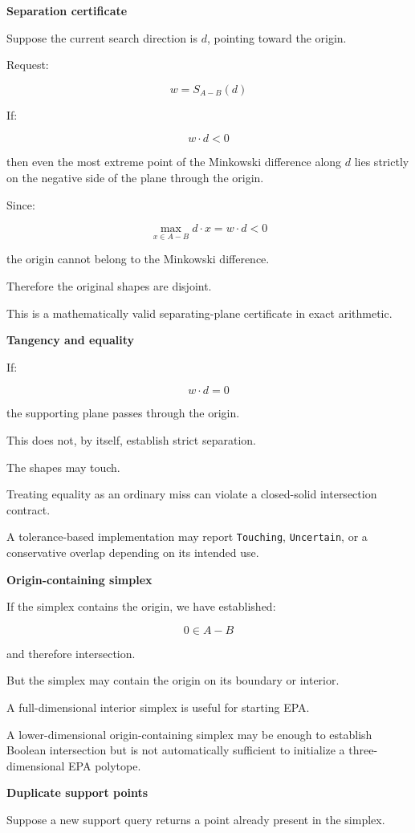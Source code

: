 \textbf{Separation certificate}

Suppose the current search direction is \(d\), pointing toward the origin.

Request:

\[
w=S_{A-B}(d)
\]

If:

\[
\boxed{ w\cdot d<0 }
\]

then even the most extreme point of the Minkowski difference along \(d\) lies strictly on the negative side of the plane through the origin.

Since:

\[
\max_{x\in A-B}d\cdot x=w\cdot d<0
\]

the origin cannot belong to the Minkowski difference.

Therefore the original shapes are disjoint.

This is a mathematically valid separating-plane certificate in exact arithmetic.

\textbf{Tangency and equality}

If:

\[
w\cdot d=0
\]

the supporting plane passes through the origin.

This does not, by itself, establish strict separation.

The shapes may touch.

Treating equality as an ordinary miss can violate a closed-solid intersection contract.

A tolerance-based implementation may report \texttt{Touching}, \texttt{Uncertain}, or a conservative overlap depending on its intended use.

\textbf{Origin-containing simplex}

If the simplex contains the origin, we have established:

\[
0\in A-B
\]

and therefore intersection.

But the simplex may contain the origin on its boundary or interior.

A full-dimensional interior simplex is useful for starting EPA.

A lower-dimensional origin-containing simplex may be enough to establish Boolean intersection but is not automatically sufficient to initialize a three-dimensional EPA polytope.

\textbf{Duplicate support points}

Suppose a new support query returns a point already present in the simplex.


